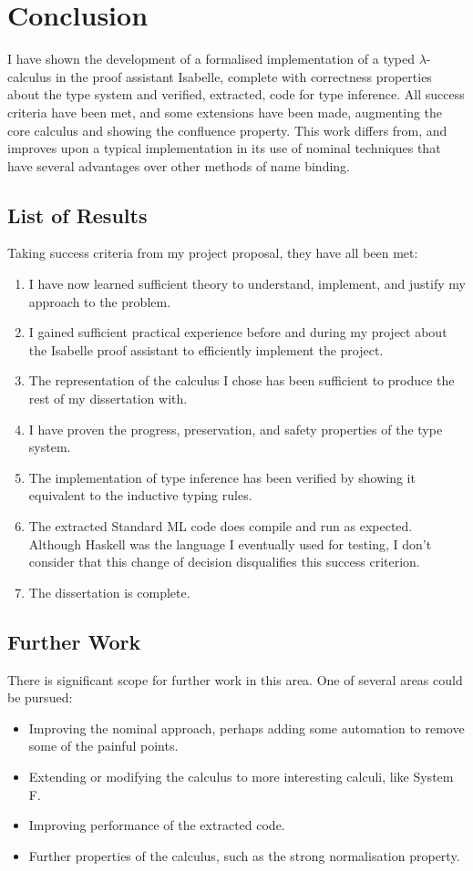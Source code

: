 \chapter{Conclusion}
I have shown the development of a formalised implementation of a typed \(\lambda\)-calculus in the proof assistant Isabelle, complete with correctness properties about the type system and verified, extracted, code for type inference.
All success criteria have been met, and some extensions have been made, augmenting the core calculus and showing the confluence property.
This work differs from, and improves upon a typical implementation in its use of nominal techniques that have several advantages over other methods of name binding.

\section{List of Results}
Taking success criteria from my project proposal, they have all been met:
\begin{enumerate}
\item
I have now learned sufficient theory to understand, implement, and justify my approach to the problem.
\item
I gained sufficient practical experience before and during my project about the Isabelle proof assistant to efficiently implement the project.
\item
The representation of the calculus I chose has been sufficient to produce the rest of my dissertation with.
\item
I have proven the progress, preservation, and safety properties of the type system.
\item
The implementation of type inference has been verified by showing it equivalent to the inductive typing rules.
\item
The extracted Standard ML code does compile and run as expected.
Although Haskell was the language I eventually used for testing, I don't consider that this change of decision disqualifies this success criterion.
\item
The dissertation is complete.
\end{enumerate}

\section{Further Work}
There is significant scope for further work in this area.
One of several areas could be pursued:
\begin{itemize}
\item
Improving the nominal approach, perhaps adding some automation to remove some of the painful points.
\item
Extending or modifying the calculus to more interesting calculi, like System F.
\item
Improving performance of the extracted code.
\item
Further properties of the calculus, such as the strong normalisation property.
\end{itemize}
